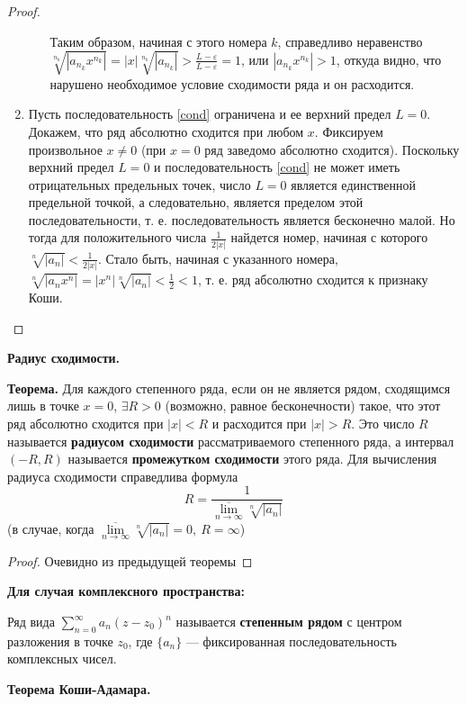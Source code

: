 \begin{proof}
\begin{enumerate}
\begin{itemize}
        Таким образом, начиная с этого номера $k$, справедливо неравенство $\sqrt[n_k]{|a_{n_k}x^{n_k}|}=|x|\sqrt[n_k]{|a_{n_k}|}>\frac{L-\varepsilon}{L-\varepsilon}=1$, или $|a_{n_k}x^{n_k}| > 1$, откуда видно, что нарушено необходимое условие сходимости ряда и он расходится.
    \end{itemize}
    \item Пусть последовательность \eqref{cond} ограничена и ее верхний предел $L = 0$.
    Докажем, что ряд абсолютно сходится при любом $x$.
    Фиксируем произвольное $x\neq 0$ (при $x = 0$ ряд заведомо абсолютно сходится). Поскольку верхний предел $L = 0$ и последовательность \eqref{cond} не может иметь отрицательных предельных точек, число $L = 0$ является единственной предельной точкой, а следовательно, является пределом этой последовательности, т. е. последовательность является бесконечно малой.
    Но тогда для положительного числа $\frac{1}{2|x|}$ найдется номер, начиная с которого $\sqrt[n]{|a_n|} < \frac{1}{2|x|}$.
    Стало быть, начиная с указанного номера, $\sqrt[n]{|a_n x^n|}=|x^n|\sqrt[n]{|a_n|}<\frac{1}{2}<1$, т. е. ряд абсолютно сходится к признаку Коши.
\end{enumerate}
\end{proof}


\textbf{Радиус сходимости.}

\textbf{Теорема.} Для каждого степенного ряда, если он не является рядом, сходящимся лишь в точке $x = 0$, $\exists R > 0$ (возможно, равное бесконечности) такое, что этот ряд абсолютно сходится при $|x| < R$ и расходится при $|x| > R$.
Это число $R$ называется \textbf{радиусом сходимости} рассматриваемого степенного ряда, 
а интервал $(-R, R)$ называется \textbf{промежутком сходимости} этого ряда.
Для вычисления радиуса сходимости справедлива формула
$$R=\frac{1}{\overline{\lim\limits_{n\to\infty}}\sqrt[n]{|a_n|}}$$
(в случае, когда $\overline{\lim\limits_{n\to\infty}}\sqrt[n]{|a_n|} = 0,~R = \infty$)

\begin{proof}
Очевидно из предыдущей теоремы
\end{proof}

\textbf{Для случая комплексного пространства:}

Ряд вида $\displaystyle\sum_{n=0}^{\infty}a_n(z-z_0)^n$ называется \textbf{степенным рядом} с центром разложения в точке $z_0$, где $\{a_n\}$ --- фиксированная последовательность комплексных чисел.

\textbf{Теорема Коши-Адамара.} 


